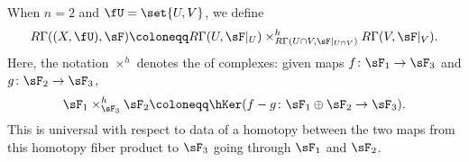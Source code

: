 When $n = 2$ and $\fU = \set{U,V}$, we define
\begin{equation}
    R\Gamma((X, \fU), \sF)\coloneqq R\Gamma(U, \sF|_U)\times^h_{R\Gamma(U\cap V, \sF|_{U\cap V})} R\Gamma(V, \sF|_V).
\end{equation}
Here, the notation $\times^h$ denotes the  of complexes: given maps $f\colon\sF_1\to\sF_3$ and $g\colon\sF_2\to\sF_3$,
\begin{equation}
    \sF_1\times^h_{\sF_3}\sF_2\coloneqq \hKer(f-g\colon\sF_1\oplus\sF_2\to\sF_3).
\end{equation}
This is universal with respect to data of a homotopy between the two maps from this homotopy fiber product to $\sF_3$ going through $\sF_1$ and $\sF_2$.
